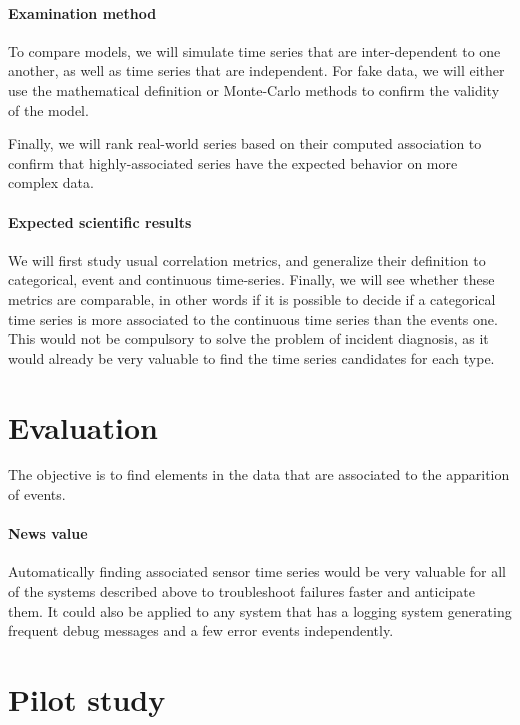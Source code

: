 \documentclass[12pt,a4paper]{article}
\begin{document}
\paragraph*{Examination method}

To compare models, we will simulate time series that are inter-dependent to one another, as well as time series that are independent.
For fake data, we will either use the mathematical definition or Monte-Carlo methods to confirm the validity of the model.

Finally, we will rank real-world series based on their computed association to confirm that highly-associated series have the expected behavior on more complex data.

\paragraph*{Expected scientific results}

We will first study usual correlation metrics, and generalize their definition to categorical, event and continuous time-series.
Finally, we will see whether these metrics are comparable, in other words if it is possible to decide if a categorical time series is more associated to the continuous time series than the events one. This would not be compulsory to solve the problem of incident diagnosis, as it would already be very valuable to find the time series candidates for each type.

\section*{Evaluation}

The objective is to find elements in the data that are associated to the apparition of events.\\

\paragraph*{News value}

Automatically finding associated sensor time series would be very valuable for all of the systems described above to troubleshoot failures faster and anticipate them. It could also be applied to any system that has a logging system generating frequent debug messages and a few error events independently.

\section*{Pilot study}
\end{document}
